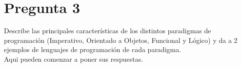 \newpage
\section*{Pregunta 3}
\Large 
Describe las principales características de los distintos paradigmas de programación (Imperativo, Orientado a Objetos, Funcional y Lógico) y da a 2 ejemplos de lenguajes de programación de cada paradigma.\\
\newline
\large
Aqui pueden comenzar a poner sus respuestas.